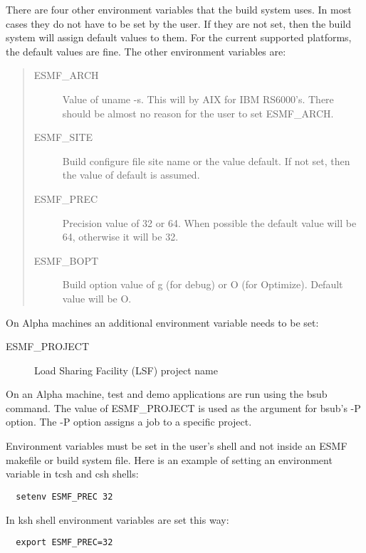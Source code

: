 There are four other environment variables that the build system uses.
In most cases they do not have to be set by the user.  If they are not
set, then the build system will assign default values to them.  For the
current supported platforms, the default values are fine.  The other
environment variables are:
\begin{quote}
\begin{description}

  \item[ESMF\_ARCH] Value of uname -s.  This will by AIX for IBM
                 RS6000's.  There should be almost no reason for the
                 user to set ESMF\_ARCH.
      

  \item[ESMF\_SITE] Build configure file site name or the value
                 default.  If not set, then the value of default is
                 assumed.

  \item[ESMF\_PREC] Precision value of 32 or 64.  When possible the
                 default value will be 64, otherwise it will be 32.

  \item[ESMF\_BOPT] Build option value of g (for debug) or O (for
                 Optimize).  Default value will be O.

\end{description}
\end{quote}

On Alpha machines an additional environment variable needs
to be set:

\begin{description}
  \item[ESMF\_PROJECT] Load Sharing Facility (LSF) project name
\end{description}

On an Alpha machine, test and demo applications are run using 
the bsub command.  The value of ESMF\_PROJECT is used as the 
argument for bsub's -P option. The -P option assigns a job to 
a specific project.  

Environment variables must be set in the user's shell and not
inside an ESMF makefile or build system file.  Here is an example 
of setting an environment variable in tcsh and csh shells:
\begin{verbatim}
  setenv ESMF_PREC 32
\end{verbatim}
In ksh shell environment variables are set this way:
\begin{verbatim}
  export ESMF_PREC=32
\end{verbatim}

